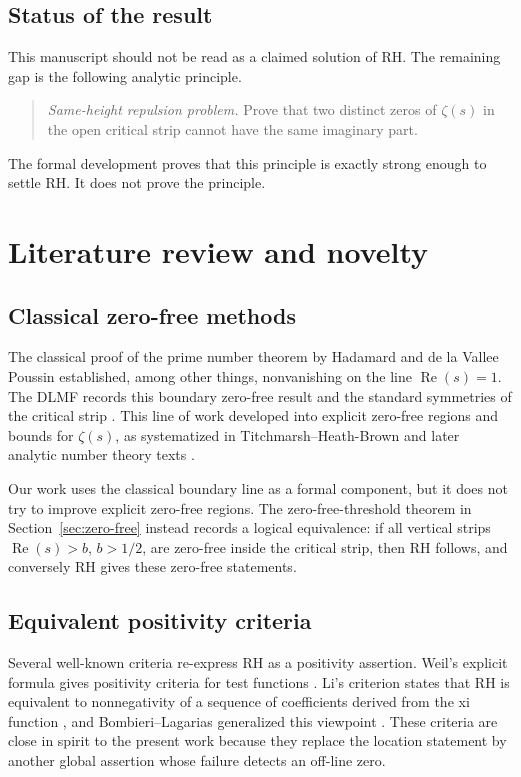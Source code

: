 \documentclass[11pt]{amsart}
\newcommand{\re}{\operatorname{Re}}
\begin{document}
\subsection*{Status of the result}

This manuscript should not be read as a claimed solution of RH.  The remaining
gap is the following analytic principle.

\begin{quote}
  \emph{Same-height repulsion problem.}  Prove that two distinct zeros of
  \(\zeta(s)\) in the open critical strip cannot have the same imaginary part.
\end{quote}

The formal development proves that this principle is exactly strong enough to
settle RH.  It does not prove the principle.

\section{Literature review and novelty}

\subsection{Classical zero-free methods}

The classical proof of the prime number theorem by Hadamard and de la Vallee
Poussin established, among other things, nonvanishing on the line
\(\re(s)=1\).  The DLMF records this boundary zero-free result and the standard
symmetries of the critical strip \cite{DLMFZetaZeros}.  This line of work
developed into explicit zero-free regions and bounds for \(\zeta(s)\), as
systematized in Titchmarsh--Heath-Brown \cite{Titchmarsh1986} and later
analytic number theory texts \cite{IwaniecKowalski2004}.

Our work uses the classical boundary line as a formal component, but it does not
try to improve explicit zero-free regions.  The zero-free-threshold theorem in
Section~\ref{sec:zero-free} instead records a logical equivalence: if all
vertical strips \(\re(s)>b\), \(b>1/2\), are zero-free inside the critical strip,
then RH follows, and conversely RH gives these zero-free statements.

\subsection{Equivalent positivity criteria}

Several well-known criteria re-express RH as a positivity assertion.  Weil's
explicit formula gives positivity criteria for test functions
\cite{Weil1952}.  Li's criterion states that RH is equivalent to nonnegativity
of a sequence of coefficients derived from the xi function \cite{Li1997}, and
Bombieri--Lagarias generalized this viewpoint \cite{BombieriLagarias1999}.
These criteria are close in spirit to the present work because they replace the
location statement by another global assertion whose failure detects an off-line
zero.
\end{document}
